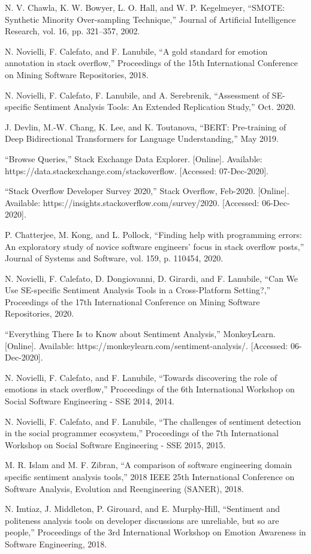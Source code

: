\documentclass[conference]{IEEEtran}
\begin{document}
\begin{thebibliography}{00}
  N. V. Chawla, K. W. Bowyer, L. O. Hall, and W. P. Kegelmeyer, “SMOTE: Synthetic Minority Over-sampling Technique,” Journal of Artificial Intelligence Research, vol. 16, pp. 321–357, 2002. 

 N. Novielli, F. Calefato, and F. Lanubile, “A gold standard for emotion annotation in stack overflow,” Proceedings of the 15th International Conference on Mining Software Repositories, 2018. 

 N. Novielli, F. Calefato, F. Lanubile, and A. Serebrenik, “Assessment of SE-specific Sentiment Analysis Tools: An Extended Replication Study,” Oct. 2020.

 J. Devlin, M.-W. Chang, K. Lee, and K. Toutanova, “BERT: Pre-training of Deep Bidirectional Transformers for Language Understanding,” May 2019. 

 “Browse Queries,” Stack Exchange Data Explorer. [Online]. Available: https://data.stackexchange.com/stackoverflow. [Accessed: 07-Dec-2020]. 

 “Stack Overflow Developer Survey 2020,” Stack Overflow, Feb-2020. [Online]. Available: https://insights.stackoverflow.com/survey/2020. [Accessed: 06-Dec-2020]. 

 P. Chatterjee, M. Kong, and L. Pollock, “Finding help with programming errors: An exploratory study of novice software engineers’ focus in stack overflow posts,” Journal of Systems and Software, vol. 159, p. 110454, 2020. 

 N. Novielli, F. Calefato, D. Dongiovanni, D. Girardi, and F. Lanubile, “Can We Use SE-specific Sentiment Analysis Tools in a Cross-Platform Setting?,” Proceedings of the 17th International Conference on Mining Software Repositories, 2020. 

 “Everything There Is to Know about Sentiment Analysis,” MonkeyLearn. [Online]. Available: https://monkeylearn.com/sentiment-analysis/. [Accessed: 06-Dec-2020]. 

 N. Novielli, F. Calefato, and F. Lanubile, “Towards discovering the role of emotions in stack overflow,” Proceedings of the 6th International Workshop on Social Software Engineering - SSE 2014, 2014. 

 N. Novielli, F. Calefato, and F. Lanubile, “The challenges of sentiment detection in the social programmer ecosystem,” Proceedings of the 7th International Workshop on Social Software Engineering - SSE 2015, 2015. 

 M. R. Islam and M. F. Zibran, “A comparison of software engineering domain specific sentiment analysis tools,” 2018 IEEE 25th International Conference on Software Analysis, Evolution and Reengineering (SANER), 2018. 

 N. Imtiaz, J. Middleton, P. Girouard, and E. Murphy-Hill, “Sentiment and politeness analysis tools on developer discussions are unreliable, but so are people,” Proceedings of the 3rd International Workshop on Emotion Awareness in Software Engineering, 2018. 

\end{thebibliography}
\end{document}
